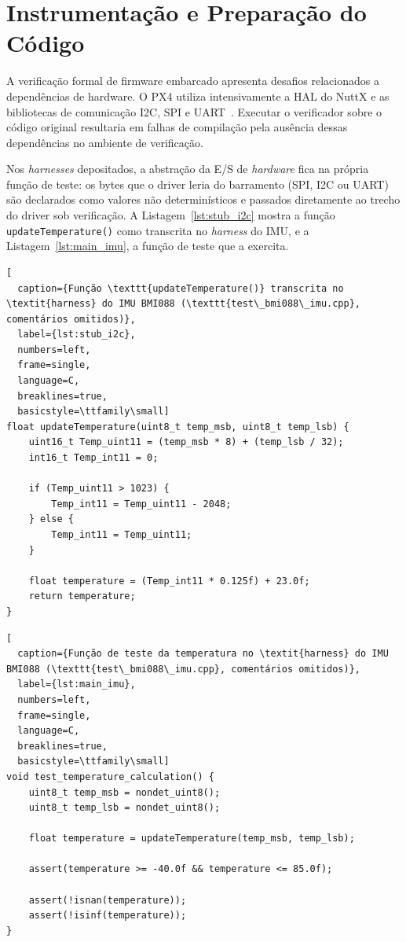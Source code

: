 \section{Instrumentação e Preparação do Código}
\label{sec:instrumentacao}

A verificação formal de firmware embarcado apresenta desafios relacionados a
dependências de hardware. O PX4 utiliza intensivamente a HAL do NuttX e as bibliotecas de comunicação I2C, SPI e UART~\cite{PX4_Documentation}. Executar o verificador sobre o código original resultaria em falhas de compilação pela ausência dessas dependências no ambiente de verificação.


Nos \textit{harnesses} depositados, a abstração da E/S de
\textit{hardware} fica na própria função de teste: os bytes que o driver leria do
barramento (SPI, I2C ou UART) são declarados como valores não determinísticos e
passados diretamente ao trecho do driver sob verificação. A
Listagem~\ref{lst:stub_i2c} mostra a função \texttt{updateTemperature()} como
transcrita no \textit{harness} do IMU, e a Listagem~\ref{lst:main_imu}, a função
de teste que a exercita.

\begin{lstlisting}[
  caption={Função \texttt{updateTemperature()} transcrita no \textit{harness} do IMU BMI088 (\texttt{test\_bmi088\_imu.cpp}, comentários omitidos)},
  label={lst:stub_i2c},
  numbers=left,
  frame=single,
  language=C,
  breaklines=true,
  basicstyle=\ttfamily\small]
float updateTemperature(uint8_t temp_msb, uint8_t temp_lsb) {
    uint16_t Temp_uint11 = (temp_msb * 8) + (temp_lsb / 32);
    int16_t Temp_int11 = 0;

    if (Temp_uint11 > 1023) {
        Temp_int11 = Temp_uint11 - 2048;
    } else {
        Temp_int11 = Temp_uint11;
    }

    float temperature = (Temp_int11 * 0.125f) + 23.0f;
    return temperature;
}
\end{lstlisting}

\begin{lstlisting}[
  caption={Função de teste da temperatura no \textit{harness} do IMU BMI088 (\texttt{test\_bmi088\_imu.cpp}, comentários omitidos)},
  label={lst:main_imu},
  numbers=left,
  frame=single,
  language=C,
  breaklines=true,
  basicstyle=\ttfamily\small]
void test_temperature_calculation() {
    uint8_t temp_msb = nondet_uint8();
    uint8_t temp_lsb = nondet_uint8();

    float temperature = updateTemperature(temp_msb, temp_lsb);

    assert(temperature >= -40.0f && temperature <= 85.0f);

    assert(!isnan(temperature));
    assert(!isinf(temperature));
}
\end{lstlisting}

